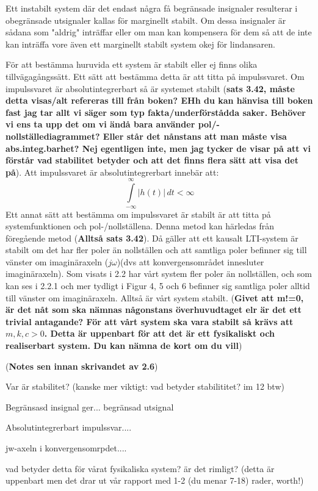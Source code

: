 Ett instabilt system där det endast några få begränsade insignaler resulterar i obegränsade utsignaler kallas för marginellt stabilt. Om dessa insignaler är sådana som "aldrig" inträffar eller om man kan kompensera för dem så att de inte kan inträffa vore även ett marginellt stabilt system okej för lindansaren.

För att bestämma huruvida ett system är stabilt eller ej finns olika tillvägagångssätt. Ett sätt att bestämma detta är att titta på impulssvaret. Om impulssvaret är absolutintegrerbart så är systemet stabilt (\textbf{sats 3.42, måste detta visas/alt refereras till från boken? EHh du kan hänvisa till boken fast jag tar allt vi säger som typ fakta/underförstådda saker. Behöver vi ens ta upp det om vi ändå bara använder pol/-nollställediagrammet? Eller står det nånstans att man måste visa abs.integ.barhet? Nej egentligen inte, men jag tycker de visar på att vi förstår vad stabilitet betyder och att det finns flera sätt att visa det på}). Att impulssvaret är absolutintegrerbart innebär att:
$$\int\limits_{-\infty}^{\infty}\big|h(t)\big|\,dt < \infty$$
Ett annat sätt att bestämma om impulssvaret är stabilt är att titta på systemfunktionen och pol-/nollställena. Denna metod kan härledas från föregående metod (\textbf{Alltså sats 3.42}). Då gäller att ett kausalt LTI-system är stabilt om det har fler poler än nollställen och att samtliga poler befinner sig till vänster om imaginäraxeln ($j\omega$)(dvs att konvergensområdet innesluter imaginäraxeln). Som visats i 2.2 har vårt system fler poler än nollställen, och som kan ses i 2.2.1 och mer tydligt i Figur 4, 5 och 6 befinner sig samtliga poler alltid till vänster om imaginäraxeln. Alltså är vårt system stabilt. (\textbf{Givet att m!=0, är det nåt som ska nämnas någonstans överhuvudtaget elr är det ett trivial antagande? För att vårt system ska vara stabilt så krävs att  $m,k,c > 0$. Detta är uppenbart för att det är ett fysikaliskt och realiserbart system. Du kan nämna de kort om du vill})

(\textbf{Notes sen innan skrivandet av 2.6})

Var är stabilitet? (kanske mer viktigt: vad betyder stabilititet? im 12 btw)

Begränsasd insignal ger... begränsad utsignal

Absolutintegrerbart impulssvar....

jw-axeln i konvergensomrpdet....

vad betyder detta för vårat fysikaliska system? är det rimligt?
(detta är uppenbart men det drar ut vår rapport med 1-2 (du menar 7-18) rader, worth!)


